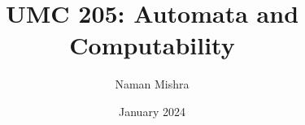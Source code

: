 \documentclass[12pt]{report}
\title{UMC 205: Automata and Computability}
\author{Naman Mishra}
\date{January 2024}
\begin{document}
\maketitle
\tableofcontents
\newpage
\listoflecture
    
    
    
    
    
    
    
    
    
    
    
    
    
    
    
    
    
    
    
    
    
    
    
    
    
\end{document}
